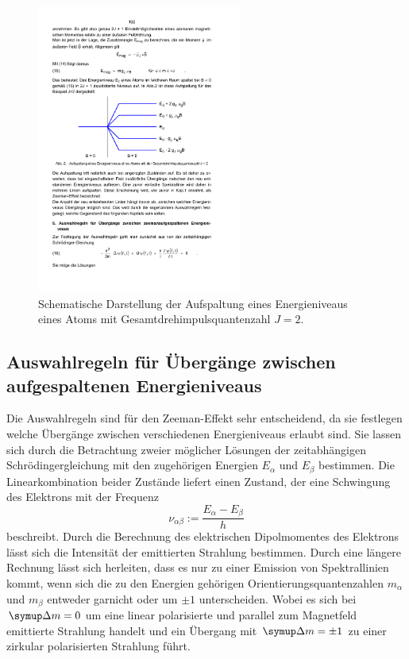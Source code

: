 \begin{figure}
    \centering
    \includegraphics[width=0.6\textwidth]{graphics/aufspaltung.pdf}
    \caption{Schematische Darstellung der Aufspaltung eines Energieniveaus eines Atoms
    mit Gesamtdrehimpulsquantenzahl $J=2$.\cite{anleitung}}
    \label{fig:aufspaltung}
\end{figure}

\subsection{Auswahlregeln für Übergänge zwischen aufgespaltenen Energieniveaus}
\label{sec:auswahl}
Die Auswahlregeln sind für den Zeeman-Effekt sehr entscheidend, da sie festlegen welche
Übergänge zwischen verschiedenen Energieniveaus erlaubt sind.
Sie lassen sich durch die Betrachtung zweier möglicher Lösungen der zeitabhängigen
Schrödingergleichung mit den zugehörigen Energien $E_{\alpha}$ und $E_{\beta}$ bestimmen.
Die Linearkombination beider Zustände liefert einen Zustand, der eine Schwingung des
Elektrons mit der Frequenz
\begin{equation}
    \nu_{\alpha\beta}:=\frac{E_{\alpha}-E_{\beta}}{h}
\end{equation}
beschreibt.
Durch die Berechnung des elektrischen Dipolmomentes des Elektrons lässt sich die Intensität
der emittierten Strahlung bestimmen. Durch eine längere Rechnung lässt sich herleiten, dass
es nur zu einer Emission von Spektrallinien kommt, wenn sich die zu den Energien
gehörigen Orientierungsquantenzahlen $m_{\alpha}$ und $m_{\beta}$ entweder garnicht
oder um $\pm 1$ unterscheiden. Wobei es sich bei $\upD m=0$ um eine linear
polarisierte und parallel zum Magnetfeld emittierte Strahlung handelt und
ein Übergang mit $\upD m=\pm1$ zu einer zirkular polarisierten Strahlung führt.

